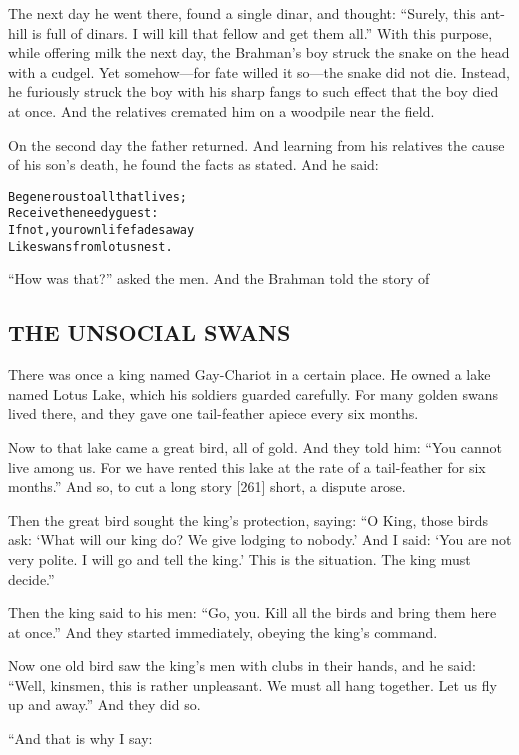 \documentclass{article}
\renewenvironment{verbatim}{\begin{alltt}\normalfont\begin{centering}}{\end{centering}\end{alltt}}
\begin{document}
The next day he went there, found a single dinar, and thought:
``Surely, this ant-hill is full of dinars. I will kill that fellow and get them all.''
With this purpose, while offering milk the next day, the Brahman's
boy struck the snake on the head with a cudgel. Yet somehow---for
fate willed it so---the snake did not die. Instead, he furiously
struck the boy with his sharp fangs to such effect that the boy
died at once. And the relatives cremated him on a woodpile near the
field.

On the second day the father returned. And learning from his
relatives the cause of his son's death, he found the facts as
stated. And he said:

\begin{verbatim}
Be generous to all that lives;
    Receive the needy guest:
If not, your own life fades away
    Like swans from lotus nest.
\end{verbatim}
``How was that?'' asked the men. And the Brahman told the story of

\subsection{THE UNSOCIAL SWANS}

There was once a king named Gay-Chariot in a certain place. He
owned a lake named Lotus Lake, which his soldiers guarded
carefully. For many golden swans lived there, and they gave one
tail-feather apiece every six months.

Now to that lake came a great bird, all of gold. And they told him:
``You cannot live among us. For we have rented this lake at the rate of a tail-feather for six months.''
And so, to cut a long story [261] short, a dispute arose.

Then the great bird sought the king's protection, saying:
``O King, those birds ask: `What will our king do? We give lodging to nobody.' And I said: `You are not very polite. I will go and tell the king.' This is the situation. The king must decide.''

Then the king said to his men:
``Go, you. Kill all the birds and bring them here at once.'' And
they started immediately, obeying the king's command.

Now one old bird saw the king's men with clubs in their hands, and
he said:
``Well, kinsmen, this is rather unpleasant. We must all hang together. Let us fly up and away.''
And they did so.

“And that is why I say:
\end{document}
